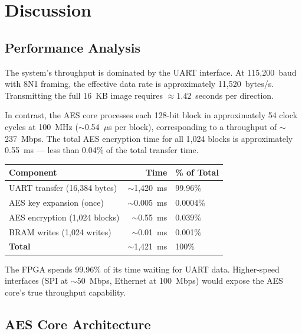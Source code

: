 \documentclass[12pt,a4paper]{article}
\begin{document}
\section{Discussion}
\label{sec:discussion}

\subsection{Performance Analysis}

The system's throughput is dominated by the UART interface. At 115,200~baud with 8N1 framing, the effective data rate is approximately 11,520~bytes/s. Transmitting the full 16~KB image requires $\approx 1.42$~seconds per direction.

In contrast, the AES core processes each 128-bit block in approximately 54 clock cycles at 100~MHz ($\sim$0.54~$\mu$s per block), corresponding to a throughput of $\sim$237~Mbps. The total AES encryption time for all 1,024 blocks is approximately 0.55~ms — less than 0.04\% of the total transfer time.

\begin{center}\small
\begin{tabular}{lrl}\toprule
\textbf{Component} & \textbf{Time} & \textbf{\% of Total} \\ \midrule
UART transfer (16,384 bytes)     & $\sim$1,420~ms & 99.96\% \\
AES key expansion (once)         & $\sim$0.005~ms  & 0.0004\% \\
AES encryption (1,024 blocks)    & $\sim$0.55~ms   & 0.039\% \\
BRAM writes (1,024 writes)       & $\sim$0.01~ms   & 0.001\% \\
\midrule
\textbf{Total}                   & $\sim$1,421~ms   & 100\% \\
\bottomrule
\end{tabular}
\end{center}

The FPGA spends 99.96\% of its time waiting for UART data. Higher-speed interfaces (SPI at $\sim$50~Mbps, Ethernet at 100~Mbps) would expose the AES core's true throughput capability.

\subsection{AES Core Architecture}
\end{document}
